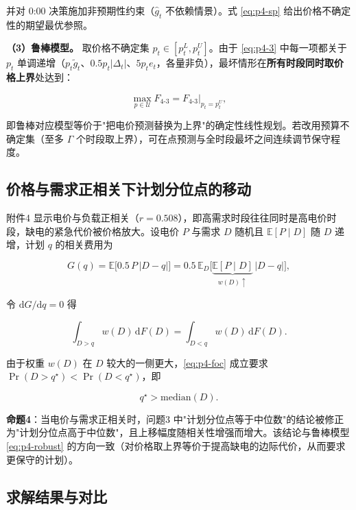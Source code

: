 并对 0:00 决策施加非预期性约束（$\hat g_t$ 不依赖情景）。式 \eqref{eq:p4-sp} 给出价格不确定性的期望最优参照。

\textbf{（3）鲁棒模型。} 取价格不确定集 $p_t\in[p^{L}_t,p^{U}_t]$。由于 \cref{eq:p4-3} 中每一项都关于 $p_t$ 单调递增（$p_t\tilde g_t$、$0.5p_t|\Delta_t|$、$5p_t e_t$，各量非负），最坏情形在\textbf{所有时段同时取价格上界}处达到：

\begin{equation}
  \max_{p\in\mathcal U}F_{4\text{-}3}=F_{4\text{-}3}\big|_{p_t=p^{U}_t},
  \label{eq:p4-robust}
\end{equation}

即鲁棒对应模型等价于"把电价预测替换为上界"的确定性线性规划。若改用预算不确定集（至多 $\Gamma$ 个时段取上界），可在点预测与全时段最坏之间连续调节保守程度。

\subsection{价格与需求正相关下计划分位点的移动}

附件4 显示电价与负载正相关（$r=0.508$），即高需求时段往往同时是高电价时段，缺电的紧急代价被价格放大。设电价 $P$ 与需求 $D$ 随机且 $\mathbb{E}[P\mid D]$ 随 $D$ 递增，计划 $q$ 的相关费用为

\begin{equation}
  G(q)=\mathbb{E}\Big[0.5\,P\,|D-q|\Big]
  =0.5\,\mathbb{E}_D\Big[\underbrace{\mathbb{E}[P\mid D]}_{w(D)\uparrow}\,|D-q|\Big],
  \label{eq:p4-weighted}
\end{equation}

令 $\mathrm{d}G/\mathrm{d}q=0$ 得

\begin{equation}
  \int_{D>q}w(D)\,\mathrm{d}F(D)=\int_{D<q}w(D)\,\mathrm{d}F(D).
  \label{eq:p4-foc}
\end{equation}

由于权重 $w(D)$ 在 $D$ 较大的一侧更大，\cref{eq:p4-foc} 成立要求 $\Pr(D>q^\star)<\Pr(D<q^\star)$，即

\begin{equation}
  q^\star>\mathrm{median}(D).
  \label{eq:p4-qstar}
\end{equation}

\textbf{命题4}：当电价与需求正相关时，问题3 中"计划分位点等于中位数"的结论被修正为"计划分位点高于中位数"，且上移幅度随相关性增强而增大。该结论与鲁棒模型 \cref{eq:p4-robust} 的方向一致（对价格取上界等价于提高缺电的边际代价，从而要求更保守的计划）。

\subsection{求解结果与对比}

